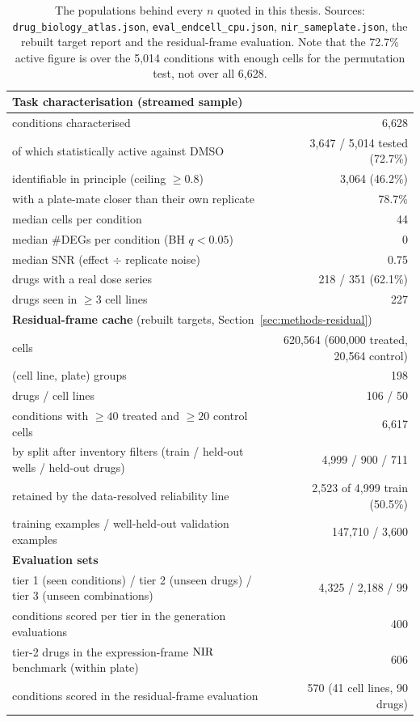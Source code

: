 \begin{table}[h]
\centering
\begin{tabular}{lr}
\toprule
\multicolumn{2}{l}{\textbf{Task characterisation} (streamed sample)} \\
\midrule
conditions characterised & 6,628 \\
\quad of which statistically active against DMSO & 3,647 / 5,014 tested (72.7\%) \\
\quad identifiable in principle (ceiling $\geq 0.8$) & 3,064 (46.2\%) \\
\quad with a plate-mate closer than their own replicate & 78.7\% \\
median cells per condition & 44 \\
median \#DEGs per condition (BH $q<0.05$) & 0 \\
median SNR (effect $\div$ replicate noise) & 0.75 \\
drugs with a real dose series & 218 / 351 (62.1\%) \\
drugs seen in $\geq 3$ cell lines & 227 \\
\midrule
\multicolumn{2}{l}{\textbf{Residual-frame cache} (rebuilt targets, Section~\ref{sec:methods-residual})} \\
\midrule
cells & 620,564 (600,000 treated, 20,564 control) \\
(cell line, plate) groups & 198 \\
drugs / cell lines & 106 / 50 \\
conditions with $\geq40$ treated and $\geq20$ control cells & 6,617 \\
\quad by split after inventory filters (train / held-out wells / held-out drugs) & 4,999 / 900 / 711 \\
\quad retained by the data-resolved reliability line & 2,523 of 4,999 train (50.5\%) \\
training examples / well-held-out validation examples & 147,710 / 3,600 \\
\midrule
\multicolumn{2}{l}{\textbf{Evaluation sets}} \\
\midrule
tier 1 (seen conditions) / tier 2 (unseen drugs) / tier 3 (unseen combinations) & 4,325 / 2,188 / 99 \\
conditions scored per tier in the generation evaluations & 400 \\
tier-2 drugs in the expression-frame $\textrm{NIR}$ benchmark (within plate) & 606 \\
conditions scored in the residual-frame evaluation & 570 (41 cell lines, 90 drugs) \\
\bottomrule
\end{tabular}
\caption{The populations behind every $n$ quoted in this thesis. Sources:
\texttt{drug\_biology\_atlas.json}, \texttt{eval\_endcell\_cpu.json},
\texttt{nir\_sameplate.json}, the rebuilt target report and the residual-frame evaluation. Note
that the 72.7\% active figure is over the 5,014 conditions with enough cells for the permutation
test, not over all 6,628.}
\label{tab:scale}
\end{table}

